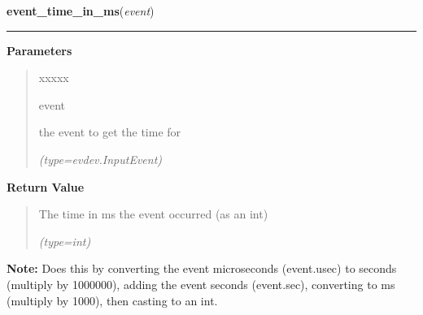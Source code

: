     \label{PowerMateEventHandler:event_time_in_ms}

    \vspace{0.5ex}

\hspace{.8\funcindent}\begin{boxedminipage}{\funcwidth}

    \raggedright \textbf{event\_time\_in\_ms}(\textit{event})

    \vspace{-1.5ex}

    \rule{\textwidth}{0.5\fboxrule}
\setlength{\parskip}{2ex}
\setlength{\parskip}{1ex}
      \textbf{Parameters}
      \vspace{-1ex}

      \begin{quote}
        \begin{Ventry}{xxxxx}

          \item[event]

          the event to get the time for

            {\it (type=evdev.InputEvent)}

        \end{Ventry}

      \end{quote}

      \textbf{Return Value}
    \vspace{-1ex}

      \begin{quote}
      The time in ms the event occurred (as an int)

      {\it (type=int)}

      \end{quote}

\textbf{Note:} Does this by converting the event microseconds (event.usec) to seconds 
(multiply by 1000000), adding the event seconds (event.sec), converting to 
ms (multiply by 1000), then casting to an int.



    \end{boxedminipage}

    \label{PowerMateEventHandler:get_uinput}

    \vspace{0.5ex}

